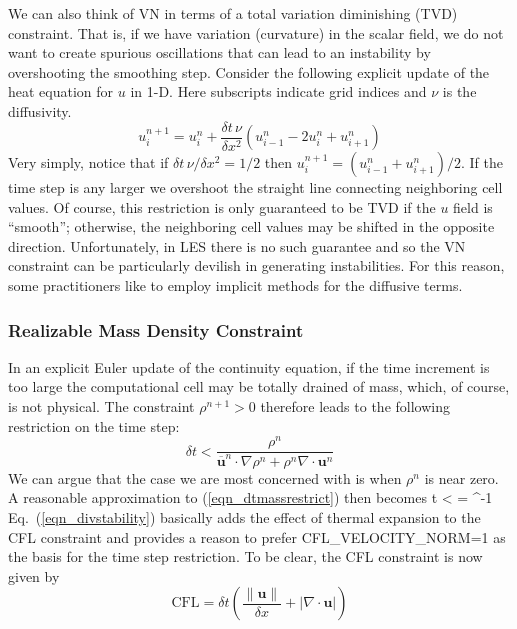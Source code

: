 \documentclass[11pt]{book}
\begin{document}
We can also think of VN in terms of a total variation diminishing (TVD) constraint.  That is, if we have variation (curvature) in the scalar field, we do not want to create spurious oscillations that can lead to an instability by overshooting the smoothing step.  Consider the following explicit update of the heat equation for $u$ in 1-D. Here subscripts indicate grid indices and $\nu$ is the diffusivity.
\begin{equation}
u_i^{n+1} = u_i^n + \frac{\delta t \, \nu}{\delta x^2} (u_{i-1}^n - 2u_i^n + u_{i+1}^n )
\end{equation}
Very simply, notice that if $\delta t \, \nu/\delta x^2 = 1/2$ then $u_i^{n+1} = (u_{i-1}^n + u_{i+1}^n)/2$.  If the time step is any larger we overshoot the straight line connecting neighboring cell values.  Of course, this restriction is only guaranteed to be TVD if the $u$ field is ``smooth''; otherwise, the neighboring cell values may be shifted in the opposite direction.  Unfortunately, in LES there is no such guarantee and so the VN constraint can be particularly devilish in generating instabilities. For this reason, some practitioners like to employ implicit methods for the diffusive terms.

\subsubsection{Realizable Mass Density Constraint}

In an explicit Euler update of the continuity equation, if the time increment is too large the computational cell may be totally drained of mass, which, of course, is not physical. The constraint $\rho^{n+1}>0$ therefore leads to the following restriction on the time step:
\begin{equation}
\label{eqn_dtmassrestrict}
\delta t < \frac{\rho^n}{\overline{\mathbf{u}}^n\cdot\nabla\rho^n + \rho^n \nabla\cdot\mathbf{u}^n}
\end{equation}
We can argue that the case we are most concerned with is when $\rho^n$ is near zero.  A reasonable approximation to (\ref{eqn_dtmassrestrict}) then becomes
\be
\label{eqn_divstability}
\delta t < 
  = ^{-1}
\ee
Eq.~(\ref{eqn_divstability}) basically adds the effect of thermal expansion to the CFL constraint and provides a reason to prefer {\ct CFL\_VELOCITY\_NORM=1}
as the basis for the time step restriction. To be clear, the CFL constraint is now given by
\begin{equation}
\mbox{CFL} = \delta t \left( \frac{\|\mathbf{u}\|}{\delta x} + |\nabla\cdot\mathbf{u}| \right)
\end{equation}
\end{document}

